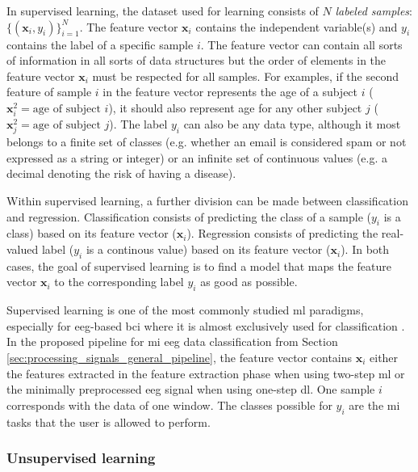 In supervised learning, the dataset used for learning consists of $N$ \textit{labeled samples}: $\{(\textbf{x}_i, y_i)\}^N_{i=1}$.
The feature vector $\textbf{x}_i$ contains the independent variable(s) and $y_i$ contains the label of a specific sample $i$.
The feature vector can contain all sorts of information in all sorts of data structures but the order of elements in the feature vector $\textbf{x}_i$ must be respected for all samples.
For examples, if the second feature of sample $i$ in the feature vector represents the age of a subject $i$ ($\textbf{x}_i^2 = \text{age of subject }i$), it should also represent age for any other subject $j$ ($\textbf{x}_j^2 = \text{age of subject }j$).
The label $y_i$ can also be any data type, although it most belongs to a finite set of classes (e.g. whether an email is considered spam or not expressed as a string or integer) or an infinite set of continuous values (e.g. a decimal denoting the risk of having a disease).

Within supervised learning, a further division can be made between classification and regression.
Classification consists of predicting the class of a sample ($y_i$ is a class) based on its feature vector ($\textbf{x}_i$).
Regression consists of predicting the real-valued label ($y_i$ is a continous value) based on its feature vector ($\textbf{x}_i$).
In both cases, the goal of supervised learning is to find a model that maps the feature vector $\textbf{x}_i$ to the corresponding label $y_i$ as good as possible.

Supervised learning is one of the most commonly studied \gls{ml} paradigms, especially for \gls{eeg}-based \gls{bci} where it is almost exclusively used for classification \citep{bci_review_arnau}.
In the proposed pipeline for \gls{mi} \gls{eeg} data classification from Section \ref{sec:processing_signals_general_pipeline}, the feature vector contains $\textbf{x}_i$ either the features extracted in the feature extraction phase when using two-step \gls{ml} or the minimally preprocessed \gls{eeg} signal when using one-step \gls{dl}.
One sample $i$ corresponds with the data of one window.
The classes possible for $y_i$ are the \gls{mi} tasks that the user is allowed to perform.




\subsubsection{Unsupervised learning}
\label{subsubsec:processing_signals_ml_and_dl_tyes_of_learning_supervision_unsupervised}

